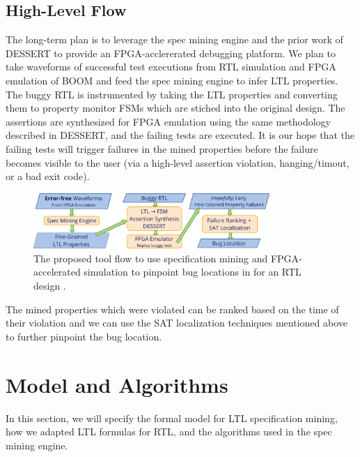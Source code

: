\documentclass[acmlarge,11pt]{acmart}
\begin{document}
\subsection{High-Level Flow}
The long-term plan is to leverage the spec mining engine and the prior work of DESSERT to provide an FPGA-acclererated debugging platform.
We plan to take waveforms of successful test executions from RTL simulation and FPGA emulation of BOOM and feed the spec mining engine to infer LTL properties.
The buggy RTL is instrumented by taking the LTL properties and converting them to property monitor FSMs which are stiched into the original design.
The assertions are synthesized for FPGA emulation using the same methodology described in DESSERT, and the failing tests are executed.
It is our hope that the failing tests will trigger failures in the mined properties before the failure becomes visible to the user (via a high-level assertion violation, hanging/timout, or a bad exit code).
\begin{figure}[H]
  \centering
  \includegraphics[width=0.8\textwidth]{figs/proposed_approach.pdf}
  \caption{The proposed tool flow to use specification mining and FPGA-accelerated simulation to pinpoint bug locations in for an RTL design .}
  \label{fig:proposed_approach}
\end{figure}
The mined properties which were violated can be ranked based on the time of their violation and we can use the SAT localization techniques mentioned above to further pinpoint the bug location.

\section{Model and Algorithms}
In this section, we will specify the formal model for LTL specification mining, how we adapted LTL formulas for RTL, and the algorithms used in the spec mining engine.
\end{document}
